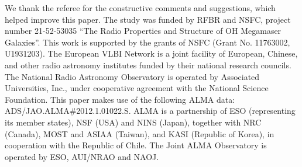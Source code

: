 \documentclass[]{aa} %
\begin{document}










\begin{acknowledgements}
  We thank the referee for the constructive comments and suggestions, which helped improve this paper.
  The study was funded by RFBR and NSFC, project number 21-52-53035 ``The Radio Properties and Structure of OH Megamaser Galaxies''.
  This work is supported by the grants of NSFC (Grant No. 11763002, U1931203).
  The European VLBI Network is a joint facility of European,
  Chinese, and other radio astronomy institutes funded by their national research councils.
  The National Radio Astronomy Observatory is operated by Associated Universities,
  Inc., under cooperative agreement with the National Science Foundation. This paper makes use of the following ALMA data: ADS/JAO.ALMA\#2012.1.01022.S. ALMA is a partnership of ESO (representing its member states), NSF (USA) and NINS (Japan), together with NRC (Canada), MOST and ASIAA (Taiwan), and KASI (Republic of Korea), in cooperation with the Republic of Chile. The Joint ALMA Observatory is operated by ESO, AUI/NRAO and NAOJ.


\end{acknowledgements}



\appendix
\end{document}
